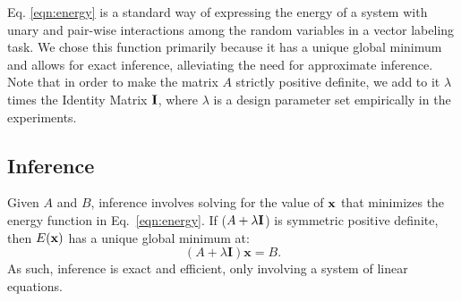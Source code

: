 \documentclass[runningheads]{llncs}
\newcommand{\mycomment}[1]{}
\newcommand{\reffig}[1]{Fig.~\ref{#1}}
\begin{document}
Eq. \ref{eqn:energy} is a standard way of expressing the energy of a system with unary and pair-wise interactions among the random variables \cite{rtf} in a vector labeling task. 
We chose this function primarily because it has a unique global minimum and allows for exact inference, alleviating the need for approximate inference. 
Note that in order to make the matrix $A$ strictly positive definite, we add to it $\lambda$ times the Identity Matrix ${\textbf I}$, where $\lambda$ is a design parameter set empirically in the experiments.

\mycomment{
\begin{figure}[]
	\centering
\texttt{[image: figures/matrix.pdf]}
	\caption{Toy example illustrating the matrices $A$ and $B$ showing up in our cost function. The input image (a) contains
		black and white pixels.  (b) shows matrix $B$, containing the unary terms: red for black pixels, blue otherwise. (c) illustrates $A$,   containing the pairwise terms
		for a $4-$connected neighbourhood: blue for two pixels having the same colour, red for different colours, white if pixels are not neighbours.}
	\label{fig:matrix}
	\hfill
	
\end{figure}
Figure \ref{fig:matrix} illustrates a toy example, showing the construction procedure of matrices $A$ and $B$.
In this example we consider a $3\times 3$ input image containing white and black pixels. The goal here is to model discontinuities in pixel colour among neighbouring pixels.
The matrix $B$, in  \reffig{fig:matrix}(a) containing the unary terms is red for black, and blue for white pixels.
The matrix $A$, shown in   \reffig{fig:matrix}(c), contains the pairwise terms between every pair of pixels.
We assume a $4-$connected neighbourhood. The pairwise term is shown to be blue for any two pixels which have the same colour, and red if they have different colours.
 A white pairwise term indicates the two pixels are not neighbours of each other. Kindly note that the width and height of matrices $A$ and $B$ respectively are $N-$dimensional, where $N$ is the number of
 pixels times the number of labels. This is a one-label toy example, hence $N$ is the number of pixels.
 As shown in figure \ref{fig:full} in our case, these matrices, $A$ and $B$ are outputs of convolutional layers of a deep network.
 }
 
\subsection{Inference} Given $A$ and $B$, inference involves solving
for the value of ${\bf x}$ that minimizes the energy function in Eq.~\ref{eqn:energy}.
 If ($A+\lambda {\textbf I}$) is symmetric positive definite, then $E({\bf x})$ has a unique global minimum \cite{conjugategradient} at:
\begin{equation}
 ( A + \lambda \mathbf{I} ) \mathbf{x} = B\text{.}
 \label{eqn:linearSolver}
\end{equation}
As such, inference  is exact and efficient, only involving a system of linear equations.
\end{document}
